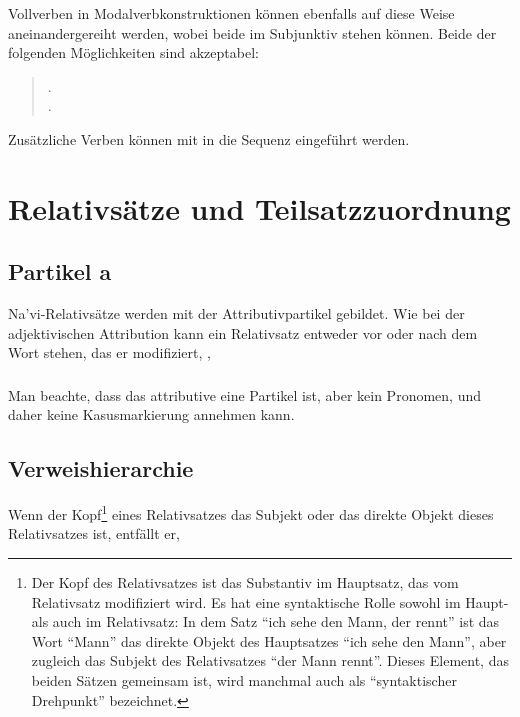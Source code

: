 Vollverben in Modalverbkonstruktionen können ebenfalls auf diese Weise aneinandergereiht werden, wobei beide im Subjunktiv stehen können. Beide der folgenden Möglichkeiten sind akzeptabel:

\begin{quotation}
	\noindent{} . \\
	\noindent{} .
\end{quotation}

\noindent Zusätzliche Verben können mit  in die Sequenz eingeführt werden. 

\section{Relativsätze und Teilsatzzuordnung}
\subsection{Partikel a} Na'vi-Relativsätze werden mit der Attributivpartikel  gebildet.\label{syn:a} Wie bei der adjektivischen Attribution kann ein Relativsatz entweder vor oder nach dem Wort stehen, das er modifiziert,  ,  

\subsubsection{} Man beachte, dass das attributive  eine Partikel ist, aber kein Pronomen, und daher keine Kasusmarkierung annehmen kann.

\subsection{Verweishierarchie} Wenn der Kopf\footnote{Der Kopf des Relativsatzes ist das Substantiv im Hauptsatz, das vom Relativsatz modifiziert wird. Es hat eine syntaktische Rolle sowohl im Haupt- als auch im Relativsatz: In dem Satz ``ich sehe den Mann, der rennt'' ist das Wort ``Mann'' das direkte Objekt des Hauptsatzes ``ich sehe den Mann'', aber zugleich das Subjekt des Relativsatzes ``der Mann rennt''. Dieses Element, das beiden Sätzen gemeinsam ist, wird manchmal auch als ``syntaktischer Drehpunkt'' bezeichnet.} eines Relativsatzes das Subjekt oder das direkte Objekt dieses Relativsatzes ist, entfällt er,

